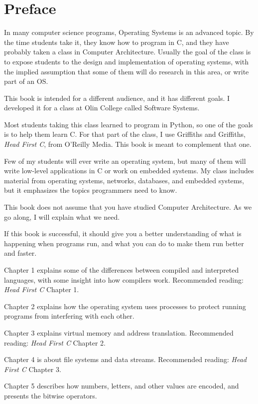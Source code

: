 \documentclass[12pt]{book}
\begin{document}
\chapter{Preface}
\label{preface}

In many computer science programs, Operating Systems is an advanced
topic.  By the time students take it, they know how to program
in C, and they have probably taken a class in Computer Architecture.
Usually the goal of the class is to expose students to the design
and implementation of operating systems, with the implied assumption
that some of them will do research in this area, or write part of
an OS.

This book is intended for a different audience, and it has different
goals.  I developed it for a class at Olin College called Software
Systems.

Most students taking this class learned to program in Python,
so one of the goals is to help them learn C.
For that part of the class, I use Griffiths and Griffiths, {\it Head
  First C}, from O'Reilly Media.  This book is meant to complement
that one.

Few of my students will ever write an operating system, but many of
them will write low-level applications in C or work on embedded
systems.  My class includes material from operating systems, networks,
databases, and embedded systems, but it emphasizes the topics
programmers need to know.

This book does not assume that you have studied Computer Architecture.
As we go along, I will explain what we need.

If this book is successful, it should give you a better understanding
of what is happening when programs run, and what you can do to make
them run better and faster.

Chapter 1 explains some of the differences between compiled and
interpreted languages, with some insight into how compilers work.
Recommended reading: {\it Head First C} Chapter 1.

Chapter 2 explains how the operating system uses processes to
protect running programs from interfering with each other.

Chapter 3 explains virtual memory and address translation.
Recommended reading: {\it Head First C} Chapter 2.

Chapter 4 is about file systems and data streams.
Recommended reading: {\it Head First C} Chapter 3.

Chapter 5 describes how numbers, letters, and other values are
encoded, and presents the bitwise operators.
\end{document}
